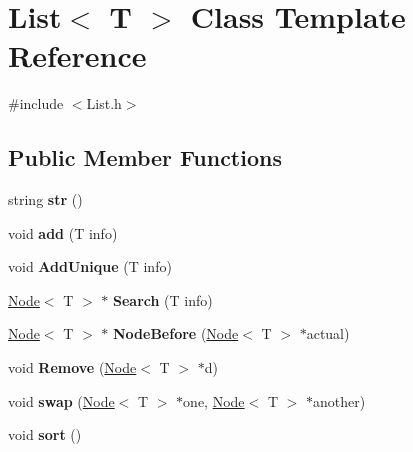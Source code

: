 \hypertarget{class_list}{\section{List$<$ T $>$ Class Template Reference}
\label{class_list}
}


{\ttfamily \#include $<$List.\-h$>$}

\subsection*{Public Member Functions}
\begin{DoxyCompactItemize}
\item 
\hypertarget{class_list_ae48f635f942950cb7cf02b489ce02add}{string {\bfseries str} ()}\label{class_list_ae48f635f942950cb7cf02b489ce02add}

\item 
\hypertarget{class_list_a9dbfde48bd54fd5f15a2bfe3dced3571}{void {\bfseries add} (T info)}\label{class_list_a9dbfde48bd54fd5f15a2bfe3dced3571}

\item 
\hypertarget{class_list_a8d60d73e332944bdc5ab6a56a896d14d}{void {\bfseries Add\-Unique} (T info)}\label{class_list_a8d60d73e332944bdc5ab6a56a896d14d}

\item 
\hypertarget{class_list_a97a7ff0ff11dd7f44b0482a28ebe4c2c}{\hyperlink{class_node}{Node}$<$ T $>$ $\ast$ {\bfseries Search} (T info)}\label{class_list_a97a7ff0ff11dd7f44b0482a28ebe4c2c}

\item 
\hypertarget{class_list_a5f9333f05ec8cae798a4b2c13bb27350}{\hyperlink{class_node}{Node}$<$ T $>$ $\ast$ {\bfseries Node\-Before} (\hyperlink{class_node}{Node}$<$ T $>$ $\ast$actual)}\label{class_list_a5f9333f05ec8cae798a4b2c13bb27350}

\item 
\hypertarget{class_list_aeed300a4a7f2d87f0bce5f746e4e97aa}{void {\bfseries Remove} (\hyperlink{class_node}{Node}$<$ T $>$ $\ast$d)}\label{class_list_aeed300a4a7f2d87f0bce5f746e4e97aa}

\item 
\hypertarget{class_list_a65c23c9bdad36a6e00a39fc9869dd11b}{void {\bfseries swap} (\hyperlink{class_node}{Node}$<$ T $>$ $\ast$one, \hyperlink{class_node}{Node}$<$ T $>$ $\ast$another)}\label{class_list_a65c23c9bdad36a6e00a39fc9869dd11b}

\item 
\hypertarget{class_list_adcdf869b2506e2332052eff47afc8412}{void {\bfseries sort} ()}\label{class_list_adcdf869b2506e2332052eff47afc8412}


\end{DoxyCompactItemize}

